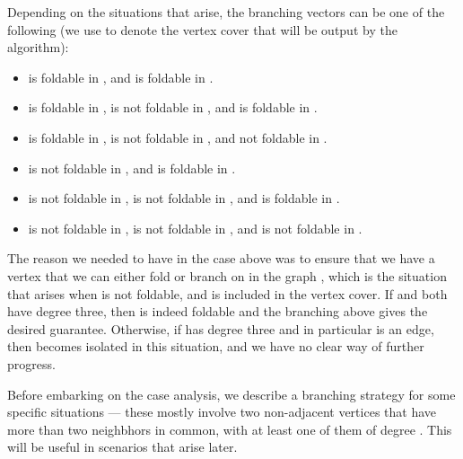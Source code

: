 \documentclass[svgnames]{llncs}
\newcommand{\branchvector}[1]{{\color{IndianRed}{}}}
\begin{document}
{\begin{enumerate}[series=main,label=\bfseries Case~\arabic*:]
Depending on the situations that arise, the branching vectors can be one of the following (we use  to denote the vertex cover that will be output by the algorithm):

\begin{itemize}
\item  is foldable in , and  is foldable in . \branchvector{2,5}
\item  is foldable in ,  is not foldable in , and  is foldable in . \branchvector{7,4,5}
\item  is foldable in ,  is not foldable in , and  not foldable in . \branchvector{7,9,5,5}
\item  is not foldable in , and  is foldable in . \branchvector{2,10,6}
\item  is not foldable in ,  is not foldable in , and  is foldable in . \branchvector{7,4,10,6}
\item  is not foldable in ,  is not foldable in , and  is not foldable in . \branchvector{7,9,5,10,6}
\end{itemize}

\end{enumerate}

The reason we needed to have  in the case above was to ensure that we have a vertex that we can either fold or branch on in the graph , which is the situation that arises
when  is not foldable, and  is included in the vertex cover. If  and  both have degree three, then  is indeed foldable and the branching above gives the desired guarantee. 
Otherwise, if  has degree three and in particular  is an edge, then  becomes isolated in this situation, and we have no clear way of further progress. 
}

Before embarking on the case analysis, we describe a branching strategy for some specific situations --- these mostly involve two non-adjacent vertices that
have more than two neighbhors in common, with at least one of them of degree . This will be useful in scenarios that arise later. 
\end{document}
